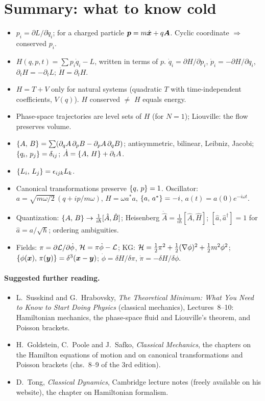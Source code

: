 \documentclass[11pt]{article}
\begin{document}
\section{Summary: what to know cold}

\begin{itemize}[nosep]
 \item $p_i=\partial L/\partial\dot q_i$; for a charged particle $\bm{p}=m\dot{\bm{x}}+q\bm{A}$. Cyclic coordinate $\Rightarrow$ conserved $p_i$.
 \item $H(q,p,t)=\sum p_i\dot q_i-L$, written in terms of $p$. $\dot q_i=\partial H/\partial p_i$, $\dot p_i=-\partial H/\partial q_i$, $\partial_tH=-\partial_tL$; $\dot H=\partial_tH$.
 \item $H=T+V$ only for natural systems (quadratic $T$ with time-independent coefficients, $V(q)$). $H$ conserved $\neq$ $H$ equals energy.
 \item Phase-space trajectories are level sets of $H$ (for $N=1$); Liouville: the flow preserves volume.
 \item $\left\{A,\,B\right\}=\sum(\partial_{q}A\,\partial_pB-\partial_pA\,\partial_qB)$; antisymmetric, bilinear, Leibniz, Jacobi; $\left\{q_i,\,p_j\right\}=\delta_{ij}$; $\dot A=\left\{A,\,H\right\}+\partial_tA$.
 \item $\left\{L_i,\,L_j\right\}=\epsilon_{ijk}L_k$.
 \item Canonical transformations preserve $\left\{q,\,p\right\}=1$. Oscillator: $a=\sqrt{m\omega/2}\,(q+ip/m\omega)$, $H=\omega a^*a$, $\left\{a,\,a^*\right\}=-i$, $a(t)=a(0)e^{-i\omega t}$.
 \item Quantization: $\left\{A,\,B\right\}\to\frac1{i\hbar}[\hat A,\hat B]$; Heisenberg $\dot{\hat A}=\frac1{i\hbar}[\hat A,\hat H]$; $[\hat a,\hat a^\dagger]=1$ for $\hat a=a/\sqrt\hbar$; ordering ambiguities.
 \item Fields: $\pi=\partial\mathcal{L}/\partial\dot\phi$, $\mathcal{H}=\pi\dot\phi-\mathcal{L}$; KG: $\mathcal{H}=\tfrac12\pi^2+\tfrac12(\nabla\phi)^2+\tfrac12m^2\phi^2$; $\left\{\phi(\bm{x}),\,\pi(\bm{y})\right\}=\delta^3(\bm{x}-\bm{y})$; $\dot\phi=\delta H/\delta\pi$, $\dot\pi=-\delta H/\delta\phi$.
\end{itemize}

\paragraph{Suggested further reading.}
\begin{itemize}[nosep]
 \item L.~Susskind and G.~Hrabovsky, \emph{The Theoretical Minimum: What You Need to Know to Start Doing Physics} (classical mechanics), Lectures~8--10: Hamiltonian mechanics, the phase-space fluid and Liouville's theorem, and Poisson brackets.
 \item H.~Goldstein, C.~Poole and J.~Safko, \emph{Classical Mechanics}, the chapters on the Hamilton equations of motion and on canonical transformations and Poisson brackets (chs.~8--9 of the 3rd edition).
 \item D.~Tong, \emph{Classical Dynamics}, Cambridge lecture notes (freely available on his website), the chapter on Hamiltonian formalism.
\end{itemize}
\end{document}
